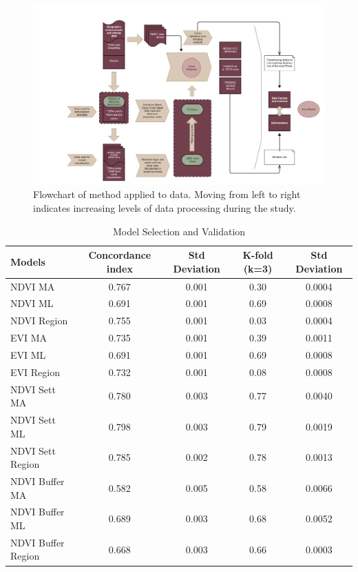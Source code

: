 
\chapter{}

\begin{landscape}
\begin{figure}[H]
  \centering
  \includegraphics[width=1.5\textwidth]{method.jpg}
\caption{Flowchart of method applied to data. Moving from left to right indicates increasing levels of data processing during the study.}
\label{fig:method}
\end{figure}
\end{landscape}

\begin{table}[H]
\footnotesize
\caption{Model Selection and Validation}
\begin{tabularx}{\linewidth}{X CCCC}
\hline
\hline
Models	& Concordance index & Std Deviation &	K-fold (k=3)	&	Std Deviation \\
\hline
NDVI MA	& 0.767 & 0.001 &	0.30	&	0.0004 \\
NDVI ML	& 0.691 & 0.001	& 0.69	&	0.0008 \\
NDVI Region & 0.755 & 0.001	&	0.03	&	0.0004 \\
EVI MA	& 0.735 & 0.001	& 0.39	&	0.0011 \\
EVI ML & 0.691 & 0.001	&	0.69	&	0.0008 \\
EVI Region & 0.732 & 0.001	&	0.08	&	0.0008 \\
NDVI Sett MA & 0.780 & 0.003 &	0.77	&	0.0040 \\
NDVI Sett ML & 0.798 & 0.003 &	0.79	&	0.0019 \\
NDVI Sett Region & 0.785 & 0.002 &	0.78	&	0.0013 \\
NDVI Buffer MA & 0.582 & 0.005	&	0.58	&	0.0066 \\
NDVI Buffer ML & 0.689 & 0.003	&	0.68	&	0.0052 \\
NDVI Buffer Region & 0.668 & 0.003	&	0.66	&	0.0003 \\
\hline
\hline
\end{tabularx}
\label{kfold}
\end{table}


